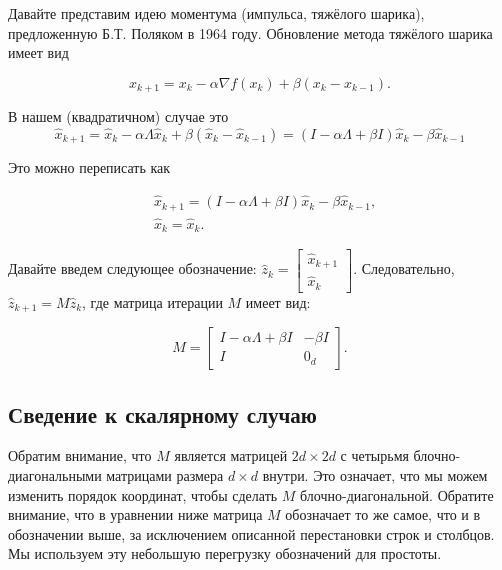 \documentclass[
  russian,
  letterpaper,
  DIV=11,
  numbers=noendperiod]{scrartcl}
\begin{document}
Давайте представим идею моментума (импульса, тяжёлого шарика),
предложенную Б.Т. Поляком в 1964 году. Обновление метода тяжёлого шарика
имеет вид

\[
x_{k+1} = x_k - \alpha \nabla f(x_k) + \beta (x_k - x_{k-1}).
\]

В нашем (квадратичном) случае это \[
\hat{x}_{k+1} = \hat{x}_k - \alpha \Lambda \hat{x}_k + \beta (\hat{x}_k - \hat{x}_{k-1}) = (I - \alpha \Lambda + \beta I) \hat{x}_k - \beta \hat{x}_{k-1}
\]

Это можно переписать как

\[
\begin{split}
&\hat{x}_{k+1} = (I - \alpha \Lambda + \beta I) \hat{x}_k - \beta \hat{x}_{k-1}, \\
&\hat{x}_{k} = \hat{x}_k.
\end{split}
\]

Давайте введем следующее обозначение: \(\hat{z}_k = \begin{bmatrix}
\hat{x}_{k+1} \\
\hat{x}_{k}
\end{bmatrix}\). Следовательно, \(\hat{z}_{k+1} = M \hat{z}_k\), где
матрица итерации \(M\) имеет вид:

\[
M = \begin{bmatrix} 
I - \alpha \Lambda + \beta I & - \beta I \\
I & 0_{d}
\end{bmatrix}.
\]

\subsection{Сведение к скалярному
случаю}\label{ux441ux432ux435ux434ux435ux43dux438ux435-ux43a-ux441ux43aux430ux43bux44fux440ux43dux43eux43cux443-ux441ux43bux443ux447ux430ux44e}

Обратим внимание, что \(M\) является матрицей \(2d \times 2d\) с
четырьмя блочно-диагональными матрицами размера \(d \times d\) внутри.
Это означает, что мы можем изменить порядок координат, чтобы сделать
\(M\) блочно-диагональной. Обратите внимание, что в уравнении ниже
матрица \(M\) обозначает то же самое, что и в обозначении выше, за
исключением описанной перестановки строк и столбцов. Мы используем эту
небольшую перегрузку обозначений для простоты.
\end{document}
